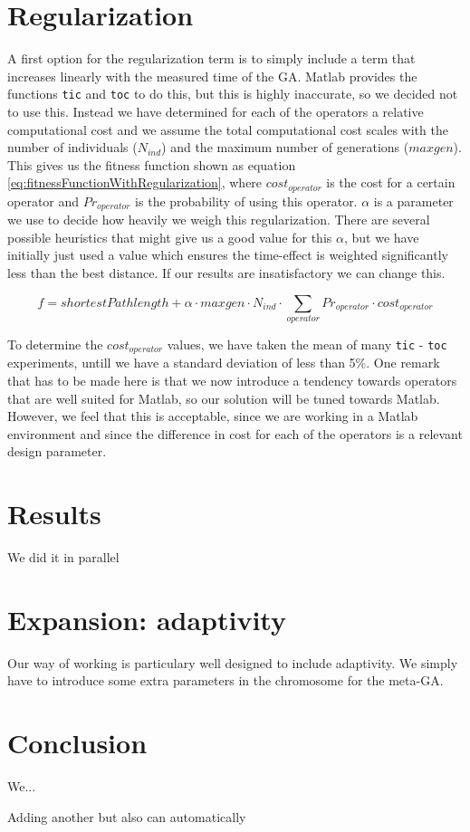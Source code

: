 \documentclass[a4paper]{article}
\begin{document}
\section{Regularization}

A first option for the regularization term is to simply include a term that increases linearly with the measured time of the GA. Matlab provides the functions \texttt{tic} and \texttt{toc} to do this, but this is highly inaccurate, so we decided not to use this. Instead we have determined for each of the operators a relative computational cost and we assume the total computational cost scales with the number of individuals ($N_{ind}$) and the maximum number of generations ($maxgen$). This gives us the fitness function shown as equation \ref{eq:fitnessFunctionWithRegularization}, where $cost_{operator}$ is the cost for a certain operator and $Pr_{operator}$ is the probability of using this operator. $\alpha$ is a parameter we use to decide how heavily we weigh this regularization. There are several possible heuristics that might give us a good value for this $\alpha$, but we have initially just used a value which ensures the time-effect is weighted significantly less than the best distance. If our results are insatisfactory we can change this.

\begin{equation}
	f=shortestPathlength + \alpha\cdot maxgen\cdot N_{ind}\cdot \sum_{operator}Pr_{operator}\cdot cost_{operator}
\label{eq:fitnessFunctionWithRegularization}
\end{equation}

To determine the $cost_{operator}$ values, we have taken the mean of many \texttt{tic} - \texttt{toc} experiments, untill we have a standard deviation of less than 5\%. One remark that has to be made here is that we now introduce a tendency towards operators that are well suited for Matlab, so our solution will be tuned towards Matlab. However, we feel that this is acceptable, since we are working in a Matlab environment and since the difference in cost for each of the operators is a relevant design parameter.

\section{Results}

We did it in parallel

\section{Expansion: adaptivity}

Our way of working is particulary well designed to include adaptivity. We simply have to introduce some extra parameters in the chromosome for the meta-GA.

\section{Conclusion}

We...

Adding another 
but also can automatically
\end{document}
